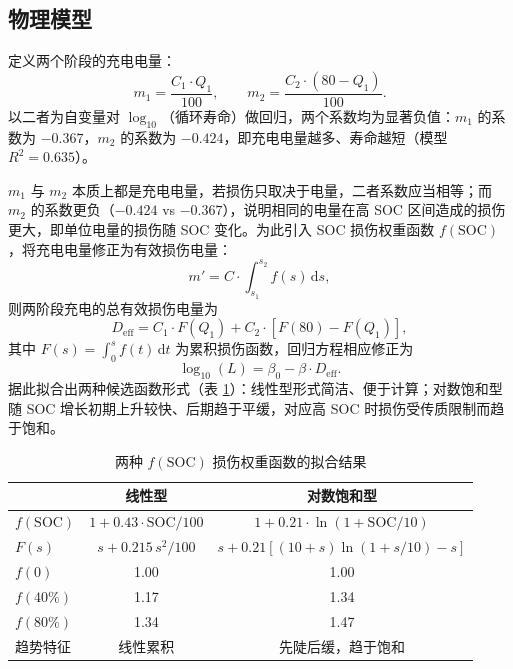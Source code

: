 \documentclass[withoutpreface]{cumcmthesis}
\begin{document}
\subsection{物理模型}\label{sec:phys}

定义两个阶段的充电电量：
\begin{equation}\label{eq:dose}
m_1 = \frac{C_1\cdot Q_1}{100},\qquad
m_2 = \frac{C_2\cdot (80-Q_1)}{100}.
\end{equation}
以二者为自变量对 $\log_{10}$（循环寿命）做回归，两个系数均为显著负值：$m_1$ 的系数为 $-0.367$，$m_2$ 的系数为 $-0.424$，即充电电量越多、寿命越短（模型 $R^2=0.635$）。

$m_1$ 与 $m_2$ 本质上都是充电电量，若损伤只取决于电量，二者系数应当相等；而 $m_2$ 的系数更负（$-0.424$ vs $-0.367$），说明相同的电量在高 SOC 区间造成的损伤更大，即单位电量的损伤随 SOC 变化。为此引入 SOC 损伤权重函数 $f(\mathrm{SOC})$，将充电电量修正为有效损伤电量：
\begin{equation}\label{eq:weight}
m' = C\cdot \int_{s_1}^{s_2} f(s)\,\mathrm{d}s,
\end{equation}
则两阶段充电的总有效损伤电量为
\begin{equation}\label{eq:deff}
D_{\mathrm{eff}} = C_1\cdot F(Q_1) + C_2\cdot\left[F(80)-F(Q_1)\right],
\end{equation}
其中 $F(s)=\int_0^s f(t)\,\mathrm{d}t$ 为累积损伤函数，回归方程相应修正为
\begin{equation}\label{eq:deff-reg}
\log_{10}(L) = \beta_0 - \beta\cdot D_{\mathrm{eff}}.
\end{equation}
据此拟合出两种候选函数形式（表 \ref{tab:fsoc}）：线性型形式简洁、便于计算；对数饱和型随 SOC 增长初期上升较快、后期趋于平缓，对应高 SOC 时损伤受传质限制而趋于饱和。

\begin{table}[htbp]
\centering
\caption{两种 $f(\mathrm{SOC})$ 损伤权重函数的拟合结果}
\label{tab:fsoc}
\begin{tabular}{lcc}
\toprule
 & 线性型 & 对数饱和型 \\
\midrule
$f(\mathrm{SOC})$ & $1+0.43\cdot\mathrm{SOC}/100$ & $1+0.21\cdot\ln(1+\mathrm{SOC}/10)$ \\
$F(s)$ & $s+0.215\,s^2/100$ & $s+0.21\left[(10+s)\ln(1+s/10)-s\right]$ \\
$f(0)$ & 1.00 & 1.00 \\
$f(40\%)$ & 1.17 & 1.34 \\
$f(80\%)$ & 1.34 & 1.47 \\
趋势特征 & 线性累积 & 先陡后缓，趋于饱和 \\
\bottomrule
\end{tabular}
\end{table}
\end{document}
